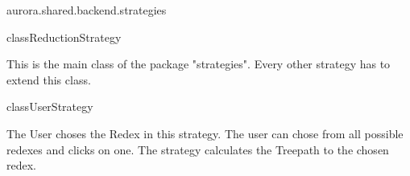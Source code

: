 \begin{texdocpackage}{aurora.shared.backend.strategies}
\begin{texdocclass}{class}{ReductionStrategy}
\label{texdoclet:aurora.shared.backend.strategies.ReductionStrategy}
\begin{texdocclassintro}
This is the main class of the package "strategies". Every other strategy has to extend this class.\end{texdocclassintro}
\begin{texdocclassconstructors}
\end{texdocclassconstructors}
\begin{texdocclassmethods}
\end{texdocclassmethods}
\end{texdocclass}


\begin{texdocclass}{class}{UserStrategy}
\label{texdoclet:aurora.shared.backend.strategies.UserStrategy}
\begin{texdocclassintro}
The User choses the Redex in this strategy.
 The user can chose from all possible redexes and clicks on one.
 The strategy calculates the Treepath to the chosen redex.\end{texdocclassintro}
\begin{texdocclassconstructors}
\end{texdocclassconstructors}
\begin{texdocclassmethods}
\end{texdocclassmethods}
\end{texdocclass}


\end{texdocpackage}



